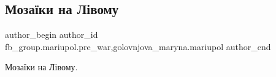  
 
 
 
 

\subsection{Мозаїки на Лівому}
\label{sec:29_01_2023.fb.fb_group.mariupol.pre_war.3.moza_ki_na_l_vomu}
 
\ifcmt
 author_begin
   author_id fb_group.mariupol.pre_war,golovnjova_maryna.mariupol
 author_end
\fi

Мозаїки на Лівому.
